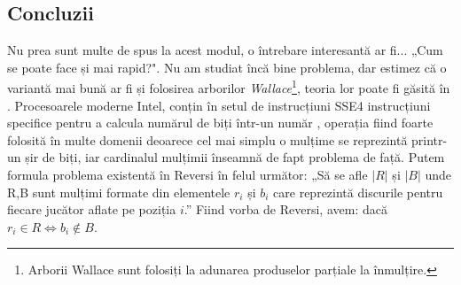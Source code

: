 \documentclass[12pt,twoside,a4paper,fleqn]{book}
\theoremstyle{definition}
\begin{document}
\subsection{Concluzii}
Nu prea sunt multe de spus la acest modul, o întrebare interesantă ar fi... „Cum se poate face și mai rapid?". Nu am studiat încă bine problema, dar estimez că o variantă mai bună ar fi și folosirea arborilor \emph{Wallace}\footnote{Arborii Wallace sunt folosiți la adunarea produselor parțiale la înmulțire.}, teoria lor poate fi găsită în \cite{cormen} \cite{hwang}. Procesoarele moderne Intel, conțin în setul de instrucțiuni SSE4 instrucțiuni specifice pentru a calcula numărul de biți într-un număr \cite{intel_sse4}, operația fiind foarte folosită în multe domenii deoarece cel mai simplu o mulțime se reprezintă printr-un șir de biți, iar cardinalul mulțimii înseamnă de fapt problema de față. Putem formula problema existentă în Reversi în felul următor: „Să se afle $|R|$ și $|B|$ unde R,B sunt mulțimi formate din elementele $r_{i}$ și $b_{i}$ care reprezintă discurile pentru fiecare jucător aflate pe poziția $i$.” Fiind vorba de Reversi, avem: dacă $r_{i} \in R \Leftrightarrow b_{i} \notin B$.
\end{document}
